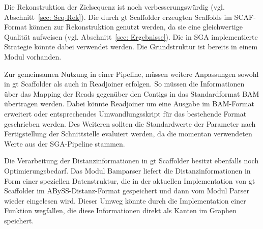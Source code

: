 \documentclass[a4paper,11pt,parskip,abstract=on]{scrartcl}
\begin{document}
Die Rekonstruktion der Zielsequenz ist noch verbesserungswürdig (vgl.
Abschnitt~\ref{sec: Seq-Rek}). Die durch gt Scaffolder
erzeugten Scaffolds im SCAF-Format können zur Rekonstruktion genutzt
werden, da sie eine gleichwertige Qualität aufweisen
(vgl. Abschnitt~\ref{sec: Ergebnisse}). Die in SGA implementierte
Strategie könnte dabei verwendet werden. Die Grundstruktur ist bereits
in einem Modul vorhanden.

Zur gemeinsamen Nutzung in einer Pipeline, müssen weitere Anpassungen sowohl
in gt Scaffolder als auch in Readjoiner erfolgen. So müssen die
Informationen über das Mapping der Reads gegenüber den Contigs in das
Standardformat BAM übertragen werden. Dabei könnte Readjoiner um
eine Ausgabe im BAM-Format erweitert oder entsprechendes Umwandlungsskript
für das bestehende Format geschrieben werden. Des Weiteren sollten die
Standardwerte der Parameter nach Fertigstellung der Schnittstelle evaluiert
werden, da die momentan verwendeten Werte aus der SGA-Pipeline stammen.

Die Verarbeitung der Distanzinformationen in gt Scaffolder besitzt ebenfalls
noch Optimierungsbedarf.
Das Modul Bamparser liefert die Distanzinformationen in Form einer speziellen
Datenstruktur, die in der aktuellen Implementation von gt Scaffolder im
ABySS-Distanz-Format gespeichert und dann vom Modul Parser wieder eingelesen
wird. Dieser Umweg könnte durch die Implementation einer Funktion wegfallen,
die diese Informationen direkt als Kanten im Graphen speichert.
\end{document}
